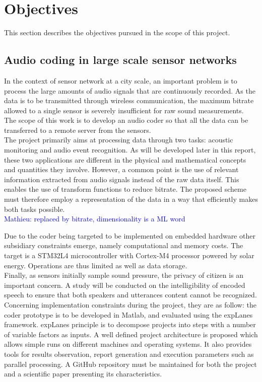 \documentclass[12pt,times,onecolumn]{article}
\newcommand{\ml}[1]{\textcolor{blue}{ Mathieu: #1}}
\begin{document}
\section{Objectives}
This section describes the objectives pursued in the scope of this project.
\subsection{Audio coding in large scale sensor networks}
In the context of sensor network at a city scale, an important problem is to process the large amounts of audio signals that are continuously recorded. As the data is to be transmitted through wireless communication, the maximum bitrate allowed to a single sensor is severely insufficient for raw sound measurements. The scope of this work is to develop an audio coder so that all the data can be transferred to a remote server from the sensors.\\

The project primarily aims at processing data through two tasks: acoustic monitoring and audio event recognition. As will be developed later in this report, these two applications are different in the physical and mathematical concepts and quantities they involve. However, a common point is the use of relevant information extracted from audio signals instead of the raw data itself. This enables the use of transform functions to reduce bitrate. The proposed scheme must therefore employ a representation of the data in a way that efficiently makes both tasks possible.\\

\ml{replaced by bitrate, dimensionality is a ML word}

Due to the coder being targeted to be implemented on embedded hardware other subsidiary constraints emerge, namely computational and memory costs. The target is a STM32L4 microcontroller with Cortex-M4 processor powered by solar energy. Operations are thus limited as well as data storage.\\

Finally, as sensors initially sample sound pressure, the privacy of citizen is an important concern. A study will be conducted on the intelligibility of encoded speech to ensure that both speakers and utterances content cannot be recognized.\\

Concerning implementation constraints during the project, they are as follow: the coder prototype is to be developed in Matlab, and evaluated using the expLanes \cite{explanes} framework. expLanes principle is to decompose projects into steps with a number of variable factors as inputs. A well defined project architecture is proposed which allows simple runs on different machines and operating systems. It also provides tools for results observation, report generation and execution parameters such as parallel processing. A GitHub repository must be maintained for both the project and a scientific paper presenting its characteristics.
\end{document}
